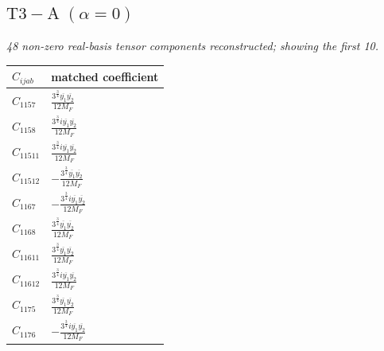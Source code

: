 \documentclass[9pt]{article}
\begin{document}
\subsection*{$ \mathrm{T3-A}\;(\alpha=0) $}
\textit{48 non-zero real-basis tensor components reconstructed; showing the first 10.}
\begin{longtable}{@{}ll@{}}
\toprule
$C_{ijab}$ & matched coefficient \\
\midrule
$C_{1157}$ & $ \frac{3^{\frac{3}{4}} \overline{y_{1}} \overline{y_{2}}}{12 M_F} $ \\
$C_{1158}$ & $ \frac{3^{\frac{3}{4}} i \overline{y_{1}} \overline{y_{2}}}{12 M_F} $ \\
$C_{11511}$ & $ \frac{3^{\frac{3}{4}} i \overline{y_{1}} \overline{y_{2}}}{12 M_F} $ \\
$C_{11512}$ & $ - \frac{3^{\frac{3}{4}} \overline{y_{1}} \overline{y_{2}}}{12 M_F} $ \\
$C_{1167}$ & $ - \frac{3^{\frac{3}{4}} i \overline{y_{1}} \overline{y_{2}}}{12 M_F} $ \\
$C_{1168}$ & $ \frac{3^{\frac{3}{4}} \overline{y_{1}} \overline{y_{2}}}{12 M_F} $ \\
$C_{11611}$ & $ \frac{3^{\frac{3}{4}} \overline{y_{1}} \overline{y_{2}}}{12 M_F} $ \\
$C_{11612}$ & $ \frac{3^{\frac{3}{4}} i \overline{y_{1}} \overline{y_{2}}}{12 M_F} $ \\
$C_{1175}$ & $ \frac{3^{\frac{3}{4}} \overline{y_{1}} \overline{y_{2}}}{12 M_F} $ \\
$C_{1176}$ & $ - \frac{3^{\frac{3}{4}} i \overline{y_{1}} \overline{y_{2}}}{12 M_F} $ \\
\bottomrule
\end{longtable}
\end{document}
